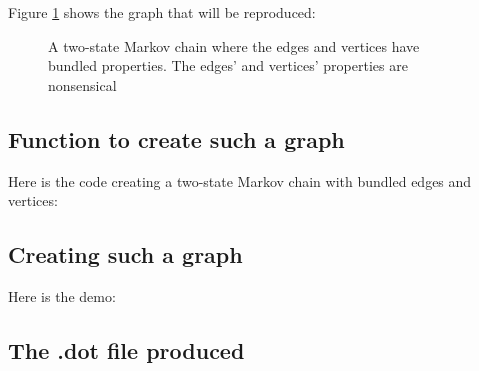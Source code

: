 Figure \ref{fig:bundled_edges_and_vertices_markov_chain}
shows the graph that will be reproduced:

\begin{figure}
  \caption{
    A two-state Markov chain where the edges and vertices have bundled properties.
    The edges' and vertices' properties are nonsensical
  }
  \label{fig:bundled_edges_and_vertices_markov_chain}
\end{figure}

\subsection{Function to create such a graph}

Here is the code creating a two-state Markov chain with bundled edges and
vertices:



\subsection{Creating such a graph}

Here is the demo:



\subsection{The .dot file produced}

